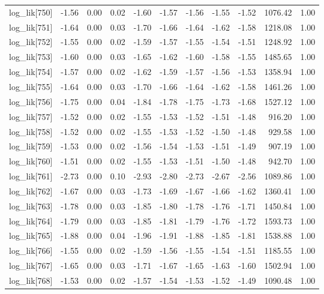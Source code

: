 \begin{table}[ht]
\begin{tabular}{rrrrrrrrrrr}
  log\_lik[750] & -1.56 & 0.00 & 0.02 & -1.60 & -1.57 & -1.56 & -1.55 & -1.52 & 1076.42 & 1.00 \\ 
  log\_lik[751] & -1.64 & 0.00 & 0.03 & -1.70 & -1.66 & -1.64 & -1.62 & -1.58 & 1218.08 & 1.00 \\ 
  log\_lik[752] & -1.55 & 0.00 & 0.02 & -1.59 & -1.57 & -1.55 & -1.54 & -1.51 & 1248.92 & 1.00 \\ 
  log\_lik[753] & -1.60 & 0.00 & 0.03 & -1.65 & -1.62 & -1.60 & -1.58 & -1.55 & 1485.65 & 1.00 \\ 
  log\_lik[754] & -1.57 & 0.00 & 0.02 & -1.62 & -1.59 & -1.57 & -1.56 & -1.53 & 1358.94 & 1.00 \\ 
  log\_lik[755] & -1.64 & 0.00 & 0.03 & -1.70 & -1.66 & -1.64 & -1.62 & -1.58 & 1461.26 & 1.00 \\ 
  log\_lik[756] & -1.75 & 0.00 & 0.04 & -1.84 & -1.78 & -1.75 & -1.73 & -1.68 & 1527.12 & 1.00 \\ 
  log\_lik[757] & -1.52 & 0.00 & 0.02 & -1.55 & -1.53 & -1.52 & -1.51 & -1.48 & 916.20 & 1.00 \\ 
  log\_lik[758] & -1.52 & 0.00 & 0.02 & -1.55 & -1.53 & -1.52 & -1.50 & -1.48 & 929.58 & 1.00 \\ 
  log\_lik[759] & -1.53 & 0.00 & 0.02 & -1.56 & -1.54 & -1.53 & -1.51 & -1.49 & 907.19 & 1.00 \\ 
  log\_lik[760] & -1.51 & 0.00 & 0.02 & -1.55 & -1.53 & -1.51 & -1.50 & -1.48 & 942.70 & 1.00 \\ 
  log\_lik[761] & -2.73 & 0.00 & 0.10 & -2.93 & -2.80 & -2.73 & -2.67 & -2.56 & 1089.86 & 1.00 \\ 
  log\_lik[762] & -1.67 & 0.00 & 0.03 & -1.73 & -1.69 & -1.67 & -1.66 & -1.62 & 1360.41 & 1.00 \\ 
  log\_lik[763] & -1.78 & 0.00 & 0.03 & -1.85 & -1.80 & -1.78 & -1.76 & -1.71 & 1450.84 & 1.00 \\ 
  log\_lik[764] & -1.79 & 0.00 & 0.03 & -1.85 & -1.81 & -1.79 & -1.76 & -1.72 & 1593.73 & 1.00 \\ 
  log\_lik[765] & -1.88 & 0.00 & 0.04 & -1.96 & -1.91 & -1.88 & -1.85 & -1.81 & 1538.88 & 1.00 \\ 
  log\_lik[766] & -1.55 & 0.00 & 0.02 & -1.59 & -1.56 & -1.55 & -1.54 & -1.51 & 1185.55 & 1.00 \\ 
  log\_lik[767] & -1.65 & 0.00 & 0.03 & -1.71 & -1.67 & -1.65 & -1.63 & -1.60 & 1502.94 & 1.00 \\ 
  log\_lik[768] & -1.53 & 0.00 & 0.02 & -1.57 & -1.54 & -1.53 & -1.52 & -1.49 & 1090.48 & 1.00 \\ 

\end{tabular}
\end{table}
